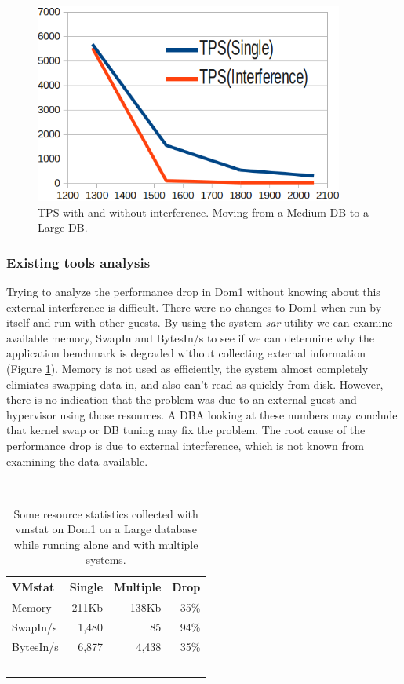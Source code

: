 \begin{figure}[!h]
  \begin{center}
  \includegraphics[width=4in]{images/MedScale.png}
  \caption{TPS with and without interference.  Moving from a Medium DB to a Large DB.}
  \label{fig:smallIO}
  \end{center}
\end{figure}

\subsubsection{Existing tools analysis}
\indent Trying to analyze the performance drop in Dom1 without knowing about this external interference is difficult.  
There were no changes to Dom1 when run by itself and run with other guests.  
By using the system \emph{sar} utility we can examine available memory, SwapIn and BytesIn/s to see if we can determine why the application benchmark is degraded without collecting external information (Figure \ref{fig:vmstat}).  
Memory is not used as efficiently, the system almost completely elimiates swapping data in, and also can't read as quickly from disk.  
However, there is no indication that the problem was due to an external guest and hypervisor using those resources.
A DBA looking at these numbers may conclude that kernel swap or DB tuning may fix the problem.  
The root cause of the performance drop is due to external interference, which is not known from examining the data available.

\begin{table}[h]
  \begin{tabular}{ l | r | r | r }
    VMstat & Single & Multiple & Drop \\ \hline
	Memory & 211Kb & 138Kb & 35\% \\
	SwapIn/s & 1,480 & 85 & 94\% \\
	BytesIn/s & 6,877 & 4,438 & 35\% \\
  \end{tabular}
\caption{Some resource statistics collected with vmstat on Dom1 on a Large database while running alone and with multiple systems.} 
\label{fig:vmstat}
\end{table}


